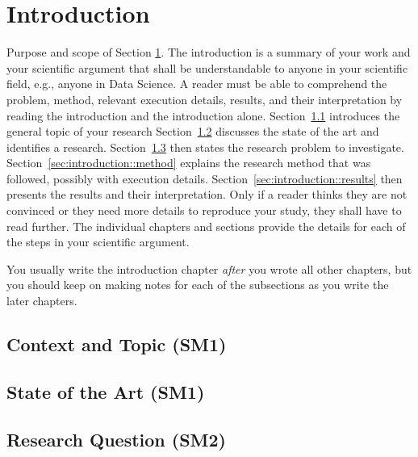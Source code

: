 \documentclass[
	a4paper,
	pagesize,
	pdftex,
	12pt,
	ngerman,
	fleqn,
	final,
	]{scrartcl}
\theoremstyle{definition}
\begin{document}
\section{Introduction}\label{sec:introduction}
	\textsf{Purpose and scope of Section \ref{sec:introduction}}. The introduction is a summary of your work and your scientific argument that shall be understandable to anyone in your scientific field, e.g., anyone in Data Science. A reader must be able to comprehend the problem, method, relevant execution details, results, and their interpretation by reading the introduction and the introduction alone.
	Section~\ref{sec:introduction::topic} introduces the general topic of your research
	Section~\ref{sec:introduction::state-of-art} discusses the state of the art and identifies a research.
	Section~\ref{sec:introduction::research-question} then states the research problem to investigate.
	Section~\ref{sec:introduction::method} explains the research method that was followed, possibly with execution details.
	Section~\ref{sec:introduction::results} then presents the results and their interpretation. Only if a reader thinks they are not convinced or they need more details to reproduce your study, they shall have to read further. The individual chapters and sections provide the details for each of the steps in your scientific argument.
	
	You usually write the introduction chapter \emph{after} you wrote all other chapters, but you should keep on making notes for each of the subsections as you write the later chapters.
	
	\subsection{Context and Topic (SM1)}\label{sec:introduction::topic}
	
	\subsection{State of the Art (SM1)}\label{sec:introduction::state-of-art}
	
	\subsection{Research Question (SM2)}\label{sec:introduction::research-question}
	
\end{document}
